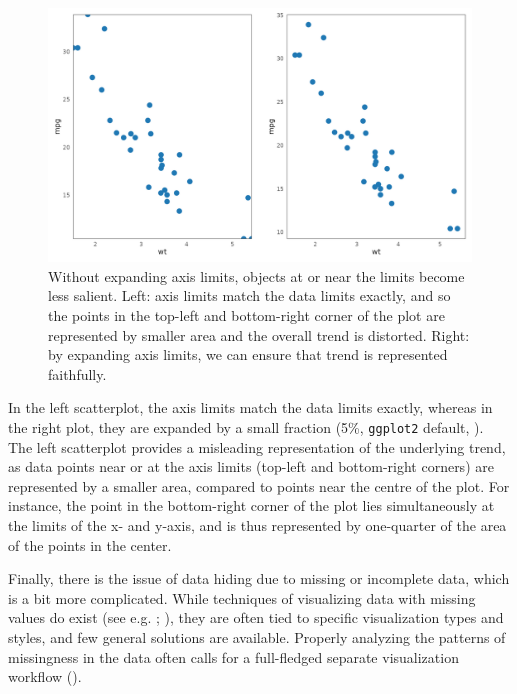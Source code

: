 \documentclass[
]{book}
\theoremstyle{definition}
\theoremstyle{definition}
\theoremstyle{definition}
\theoremstyle{definition}
\theoremstyle{remark}
\begin{document}
\begin{figure}

{\centering \includegraphics[width=1\linewidth,height=1\textheight]{./figures/expand-scatterplot} 

}

\caption{Without expanding axis limits, objects at or near the limits become less salient. Left: axis limits match the data limits exactly, and so the points in the top-left and bottom-right corner of the plot are represented by smaller area and the overall trend is distorted. Right: by expanding axis limits, we can ensure that trend is represented faithfully.}\label{fig:unnamed-chunk-13}
\end{figure}

In the left scatterplot, the axis limits match the data limits exactly, whereas in the right plot, they are expanded by a small fraction (5\%, \texttt{ggplot2} default, ). The left scatterplot provides a misleading representation of the underlying trend, as data points near or at the axis limits (top-left and bottom-right corners) are represented by a smaller area, compared to points near the centre of the plot. For instance, the point in the bottom-right corner of the plot lies simultaneously at the limits of the x- and y-axis, and is thus represented by one-quarter of the area of the points in the center.

Finally, there is the issue of data hiding due to missing or incomplete data, which is a bit more complicated. While techniques of visualizing data with missing values do exist (see e.g. ; ), they are often tied to specific visualization types and styles, and few general solutions are available. Properly analyzing the patterns of missingness in the data often calls for a full-fledged separate visualization workflow ().
\end{document}
